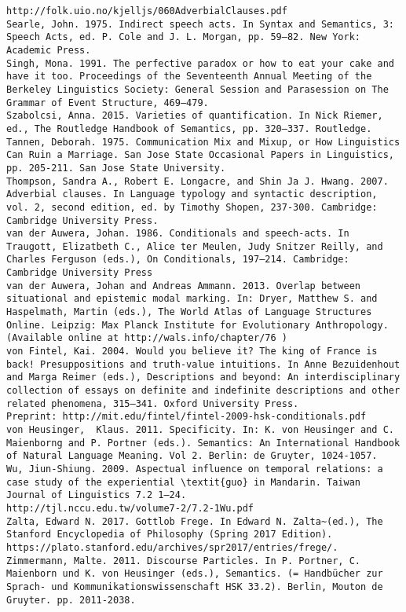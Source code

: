 \begin{verbatim}
http://folk.uio.no/kjelljs/060AdverbialClauses.pdf
Searle, John. 1975. Indirect speech acts. In Syntax and Semantics, 3: Speech Acts, ed. P. Cole and J. L. Morgan, pp. 59–82. New York: Academic Press.
Singh, Mona. 1991. The perfective paradox or how to eat your cake and have it too. Proceedings of the Seventeenth Annual Meeting of the Berkeley Linguistics Society: General Session and Parasession on The Grammar of Event Structure, 469–479.
Szabolcsi, Anna. 2015. Varieties of quantification. In Nick Riemer, ed., The Routledge Handbook of Semantics, pp. 320–337. Routledge.
Tannen, Deborah. 1975. Communication Mix and Mixup, or How Linguistics Can Ruin a Marriage. San Jose State Occasional Papers in Linguistics, pp. 205-211. San Jose State University.
Thompson, Sandra A., Robert E. Longacre, and Shin Ja J. Hwang. 2007. Adverbial clauses. In Language typology and syntactic description, vol. 2, second edition, ed. by Timothy Shopen, 237-300. Cambridge: Cambridge University Press.
van der Auwera, Johan. 1986. Conditionals and speech-acts. In Traugott, Elizatbeth C., Alice ter Meulen, Judy Snitzer Reilly, and Charles Ferguson (eds.), On Conditionals, 197–214. Cambridge: Cambridge University Press
van der Auwera, Johan and Andreas Ammann. 2013. Overlap between situational and epistemic modal marking. In: Dryer, Matthew S. and Haspelmath, Martin (eds.), The World Atlas of Language Structures Online. Leipzig: Max Planck Institute for Evolutionary Anthropology. (Available online at http://wals.info/chapter/76 )
von Fintel, Kai. 2004. Would you believe it? The king of France is back! Presuppositions and truth-value intuitions. In Anne Bezuidenhout and Marga Reimer (eds.), Descriptions and beyond: An interdisciplinary collection of essays on definite and indefinite descriptions and other related phenomena, 315–341. Oxford University Press.
Preprint: http://mit.edu/fintel/fintel-2009-hsk-conditionals.pdf
von Heusinger,  Klaus. 2011. Specificity. In: K. von Heusinger and C. Maienborng and P. Portner (eds.). Semantics: An International Handbook of Natural Language Meaning. Vol 2. Berlin: de Gruyter, 1024-1057.
Wu, Jiun-Shiung. 2009. Aspectual influence on temporal relations: a case study of the experiential \textit{guo} in Mandarin. Taiwan Journal of Linguistics 7.2 1–24.
http://tjl.nccu.edu.tw/volume7-2/7.2-1Wu.pdf
Zalta, Edward N. 2017. Gottlob Frege. In Edward N. Zalta~(ed.), The Stanford Encyclopedia of Philosophy (Spring 2017 Edition). https://plato.stanford.edu/archives/spr2017/entries/frege/.
Zimmermann, Malte. 2011. Discourse Particles. In P. Portner, C. Maienborn und K. von Heusinger (eds.), Semantics. (= Handbücher zur Sprach- und Kommunikationswissenschaft HSK 33.2). Berlin, Mouton de Gruyter. pp. 2011-2038.

\end{verbatim}
